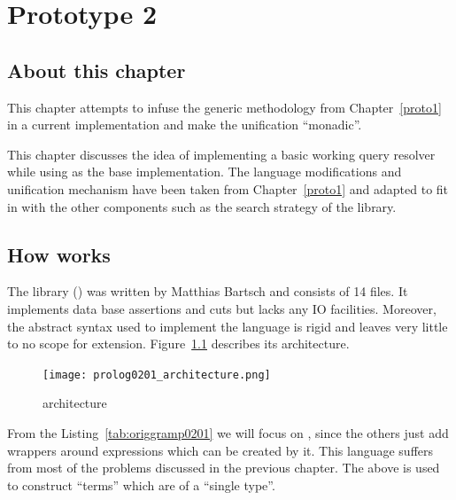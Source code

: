 \documentclass[thesis-solanki.tex]{subfiles}
\begin{document}
\chapter{Prototype 2}{\label{proto2}}

\section{About this chapter}
This chapter attempts to infuse the generic methodology from Chapter~\ref{proto1} in a current 
implementation \cite{prolog-lib} and make the unification ``monadic''.

This chapter discusses the idea of implementing a basic working  query resolver while using 
\cite{prolog-lib} as the base implementation.
The language modifications and unification mechanism have been taken from Chapter~\ref{proto1} and adapted to fit
in with the other components such as the search strategy of the library.


\section{How \protect{} works}

The  library (\cite{prolog-lib}) was written by Matthias Bartsch and consists of 14  files. It 
implements data base assertions and cuts but lacks any IO facilities. Moreover, the abstract syntax used to implement the language is rigid
and leaves very little to no scope for extension. Figure~\ref{fig:prlg0201architecture} describes its architecture.

\begin{figure}[H]
\centering
\texttt{[image: prolog0201\_architecture.png]}
\caption{ \cite{prolog-lib} architecture}
\label{fig:prlg0201architecture}
\end{figure}

From the Listing~\ref{tab:origgramp0201} we will focus on , since the others just
add wrappers around expressions which can be created by it.
This language suffers from most of the problems discussed in the previous chapter.
The above is used to construct  ``terms'' which are of a ``single type''.
\end{document}
